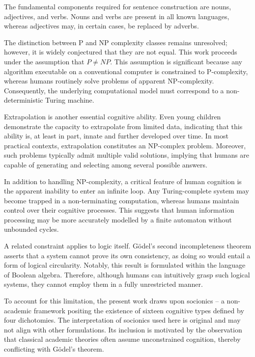 \documentclass[12pt, a4paper]{article}
\begin{document}
The fundamental components required for sentence construction are nouns, 
adjectives, and verbs\cite{Part_of_speech}. Nouns and verbs are present in all known 
languages, whereas adjectives may, in certain cases, be replaced 
by adverbs.

The distinction between P and NP complexity classes remains unresolved; 
however, it is widely conjectured that they are not equal. This 
work proceeds under the assumption that $P \ne NP$. This assumption 
is significant because any algorithm executable on a conventional 
computer is constrained to P-complexity, whereas humans routinely 
solve problems of apparent NP-complexity. Consequently, the 
underlying computational model must correspond to a non-deterministic 
Turing machine.

Extrapolation is another essential cognitive ability. Even young children 
demonstrate the capacity to extrapolate from limited data, indicating 
that this ability is, at least in part, innate and further developed over time. 
In most practical contexts, extrapolation constitutes an NP-complex problem. 
Moreover, such problems typically admit multiple valid solutions, implying that 
humans are capable of generating and selecting among several possible answers.

In addition to handling NP-complexity\cite{P_versus_NP_problem}, a critical 
feature of human cognition is the apparent inability to enter an infinite loop. 
Any Turing-complete system may become trapped in a non-terminating computation, 
whereas humans maintain control over their cognitive processes. This suggests 
that human information processing may be more accurately modelled by a finite 
automaton without unbounded cycles.

A related constraint applies to logic itself. G\"odel’s second incompleteness theorem 
asserts that a system cannot prove its own consistency, as doing so would entail a 
form of logical circularity. Notably, this result is formulated within the language 
of Boolean algebra. Therefore, although humans can intuitively grasp such logical 
systems, they cannot employ them in a fully unrestricted manner.

To account for this limitation, the present work draws upon socionics\cite{Socionics} 
-- a non-academic framework positing the existence of sixteen cognitive types defined 
by four dichotomies. The interpretation of socionics used here is original and may not align with other 
formulations. Its inclusion is motivated by the observation that classical academic 
theories often assume unconstrained cognition, thereby conflicting with G\"odel’s theorem.
\end{document}
